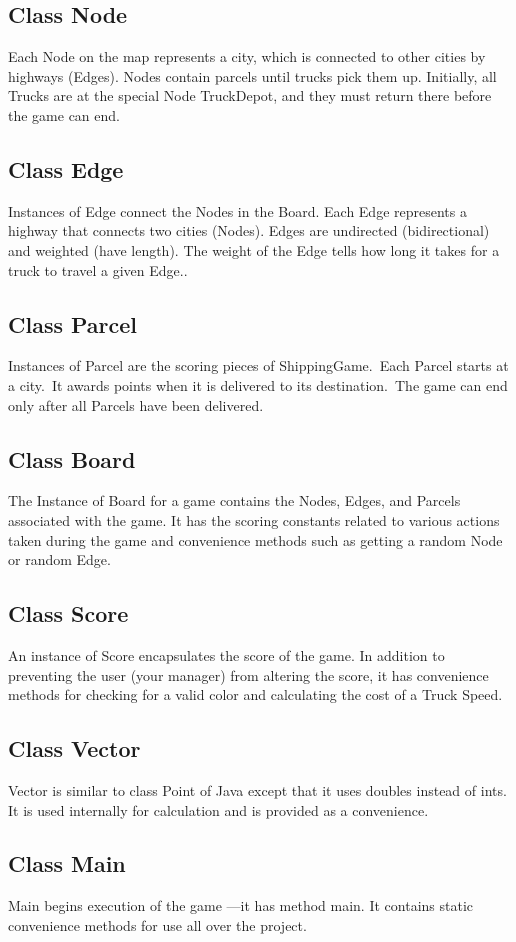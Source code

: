 \documentclass[11pt]{article}
\begin{document}
\begin{itemize}
\subsection{Class Node}
Each Node on the map represents a city, which is connected to other cities by highways (Edges). Nodes contain parcels until trucks pick them up. Initially, all Trucks are at the special Node TruckDepot, and they must return there before the game can end.
\subsection{Class Edge}
Instances of Edge connect the Nodes in the Board. Each Edge represents a highway that connects two cities (Nodes). Edges are undirected (bidirectional) and weighted (have length). The weight of the Edge tells how long it takes for a truck to travel a given Edge..
\subsection{Class Parcel}
Instances of Parcel are the scoring pieces of ShippingGame.\ Each Parcel starts at a city.\ It awards points when it is  delivered to its destination.\ The game can end only after all Parcels have been delivered.
\subsection{Class Board}
The Instance of Board for a game contains the Nodes, Edges, and Parcels associated with the game. It has the scoring constants related to various actions taken during the game and convenience methods such as getting a random Node or random Edge.
\subsection{Class Score}
An instance of Score encapsulates the score of the game. In addition to preventing the user (your manager) from altering the score, it has convenience methods for checking for a valid color and calculating the cost of a Truck Speed.
\subsection{Class Vector}
Vector is  similar to class Point of Java except that it uses doubles instead of ints. It is used internally for calculation and is provided as a convenience.
\subsection{Class Main}
Main begins execution of the game —it has method main. It contains static convenience methods for use all over the project.

\end{itemize}
\end{document}
